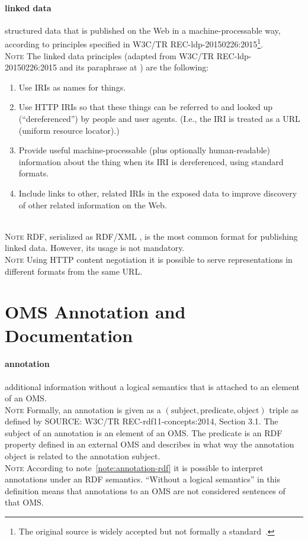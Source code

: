 \documentclass[10pt,fleqn,final]{scrreprt}
\newcommand*{\termref}[1]{\index{#1}#1\xspace}
\newcommand{\sclause}[1]{\section{#1}}
\newcommand{\termdefinition}[2]{\index{#1}\paragraph{#1} #2}
\newcommand{\nisref}[1]{#1}
\newenvironment{definitions}[0]{\medskip }{}
\newenvironment{note}[0]{\ \\ \textsc{Note} \quad}{}
\begin{document}
\begin{definitions}
\begin{definitions}
\begin{definitions}
\termdefinition{linked data}{structured data that is published on the Web in a machine-processable way, according to principles specified in \nisref{W3C/TR REC-ldp-20150226:2015}\footnote{The original source is widely accepted but not formally a standard~\cite{BernersLee:LinkedData2006}.}.}
  \begin{note}
    The linked data principles (adapted from \nisref{W3C/TR REC-ldp-20150226:2015} and its paraphrase at \cite{Wikipedia:LinkedData2011}) are the following:
    \begin{enumerate}
    \item Use IRIs as names for things.
    \item Use HTTP IRIs so that these things can be referred to and looked up (``dereferenced'') 
    by people and user agents. (I.e., the IRI is treated as a URL (uniform resource locator).)
    \item Provide useful machine-processable (plus optionally human-readable) information about the thing when its IRI is dereferenced, using standard formats.
    \item Include links to other, related IRIs in the exposed data to improve discovery of other related information on the Web.
    \end{enumerate}
  \end{note}

  \begin{note}
    RDF, serialized as RDF/XML \cite{W3C:REC-rdf-syntax-grammar-20140225}, is the most common format for publishing linked data.  However, its usage is not mandatory.
  \end{note}
  \begin{note}
    Using HTTP content negotiation \cite{rfc2616} it is possible to serve representations in different formats from the same URL. 
  \end{note}
\end{definitions}

\sclause{OMS Annotation and Documentation}\label{c:terms-annotation}
 
\begin{definitions}
  \termdefinition{annotation}{additional information without a logical semantics that is attached to an element\index{element (of an OMS)} of an \termref{OMS}.}
  \begin{note}\label{note:annotation-rdf}
Formally, an annotation is given as a $(\text{subject}, \text{predicate}, \text{object})$ triple as 
defined by \nisref{SOURCE: W3C/TR REC-rdf11-concepts:2014, Section 3.1}.  The subject of an annotation 
is an element of an OMS.  The predicate is an RDF property defined in an external OMS and 
describes in what way the annotation object is related to the annotation subject.
  \end{note}  
  \begin{note}
According to note~\ref{note:annotation-rdf} it is possible to interpret annotations under an RDF 
semantics.  ``Without a logical semantics'' in this definition means that annotations to an OMS are 
not considered sentences of that OMS.
  \end{note}


\end{definitions}
\end{definitions}
\end{definitions}
\end{document}
